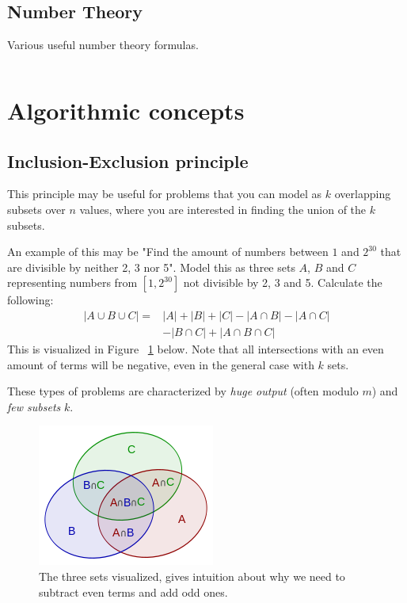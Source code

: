 \documentclass[8pt,a4paper,landscape,oneside]{amsart}
\newcommand{\code}[1]{\inputminted[fontsize=\normalsize,baselinestretch=1]{java}{code/#1}}
\begin{document}
\begin{multicols*}{3}
  \subsection{Number Theory}
  Various useful number theory formulas.
  \code{Math/Gcd.java}


\section{Algorithmic concepts}
  \subsection{Inclusion-Exclusion principle}
  This principle may be useful for problems that you can model as $k$ overlapping subsets over $n$ values, where you are interested in finding the union of the $k$ subsets.
  
  An example of this may be "Find the amount of numbers between $1$ and $2^{30}$ that are divisible by neither 2, 3 nor 5". Model this as three sets $A$, $B$ and $C$ representing numbers from $[1, 2^{30}]$ not divisible by 2, 3 and 5. Calculate the following:
  \[
  \begin{split}
  |A \cup B \cup C| = & |A| + |B| + |C| - |A \cap B| - |A \cap C| \\
  & - |B \cap C| + |A \cap B \cap C|
  \end{split}
  \]
  This is visualized in Figure ~\ref{inclusion-exclusion} below. Note that all intersections with an even amount of terms will be negative, even in the general case with $k$ sets.
  
  These types of problems are characterized by \emph{huge output} (often modulo $m$) and \emph{few subsets} $k$.
  
  \begin{figure}[H]
  \centering
   \includegraphics[scale=0.5]{inclusion-exclusion_principle.png}
   \caption{The three sets visualized, gives intuition about why we need to subtract even terms and add odd ones.}
   \label{inclusion-exclusion}
  \end{figure}
  

\end{multicols*}
\end{document}
